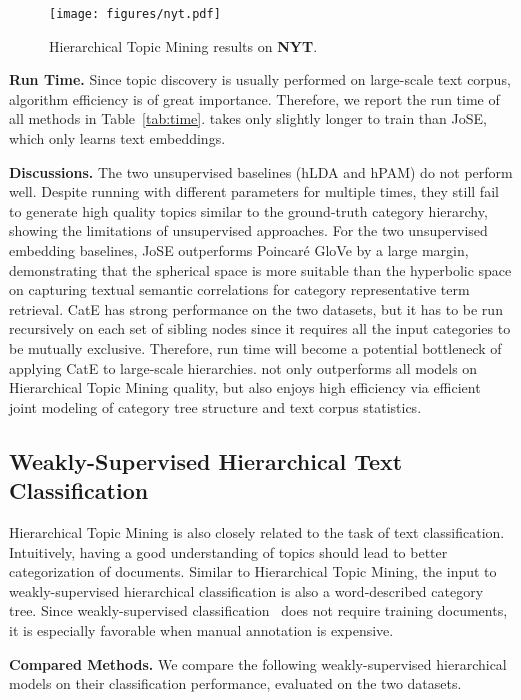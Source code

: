 \documentclass[sigconf]{acmart}
\theoremstyle{definition}
\begin{document}
\begin{figure*}[t]
\centering
\texttt{[image: figures/nyt.pdf]}
\caption{Hierarchical Topic Mining results on \textbf{NYT}.}
\label{fig:nyt}
\end{figure*}


\noindent
\textbf{Run Time.}
Since topic discovery is usually performed on large-scale text corpus, algorithm efficiency is of great importance. Therefore, we report the run time of all methods in Table~\ref{tab:time}. \josh takes only slightly longer to train than JoSE, which only learns text embeddings.

\noindent
\textbf{Discussions.} The two unsupervised baselines (hLDA and hPAM) do not perform well. Despite running with different parameters for multiple times, they still fail to generate high quality topics similar to the ground-truth category hierarchy, showing the limitations of unsupervised approaches. For the two unsupervised embedding baselines, JoSE outperforms Poincar{\'e} GloVe by a large margin, demonstrating that the spherical space is more suitable than the hyperbolic space on capturing textual semantic correlations for category representative term retrieval. CatE has strong performance on the two datasets, but it has to be run recursively on each set of sibling nodes since it requires all the input categories to be mutually exclusive. Therefore, run time will become a potential bottleneck of applying CatE to large-scale hierarchies. \josh not only outperforms all models on Hierarchical Topic Mining quality, but also enjoys high efficiency via efficient joint modeling of category tree structure and text corpus statistics.

\subsection{Weakly-Supervised Hierarchical Text Classification}
Hierarchical Topic Mining is also closely related to the task of text classification. Intuitively, having a good understanding of topics should lead to better categorization of documents. Similar to Hierarchical Topic Mining, the input to weakly-supervised hierarchical classification is also a word-described category tree. Since weakly-supervised classification~\cite{Meng2018WeaklySupervisedNT,Meng2019WeaklySupervisedHT,zhang2019higitclass} does not require training documents, it is especially favorable when manual annotation is expensive. 

\noindent
\textbf{Compared Methods.} We compare the following weakly-supervised hierarchical models on their classification performance, evaluated on the two datasets.
\end{document}
